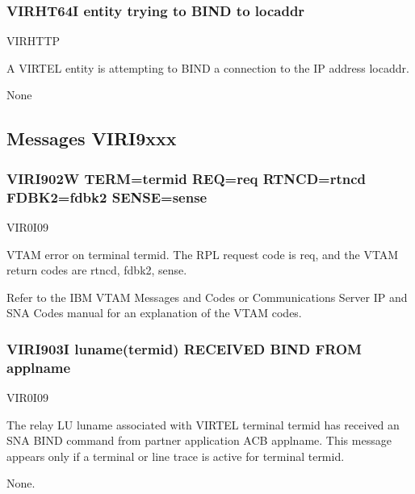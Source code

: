 \documentclass[letterpaper,10pt,english]{sphinxmanual}
\begin{document}
\subsubsection{VIRHT64I entity trying to BIND to locaddr}
\label{\detokenize{messages:virht64i-entity-trying-to-bind-to-locaddr}}\begin{description}
\sphinxAtStartPar
VIRHTTP

\sphinxAtStartPar
A VIRTEL entity is attempting to BIND a connection to the IP address locaddr.

\sphinxAtStartPar
None

\end{description}


\subsection{Messages VIRI9xxx}
\label{\detokenize{messages:messages-viri9xxx}}

\subsubsection{VIRI902W TERM=termid REQ=req RTNCD=rtncd FDBK2=fdbk2 SENSE=sense}
\label{\detokenize{messages:viri902w-term-termid-req-req-rtncd-rtncd-fdbk2-fdbk2-sense-sense}}\begin{description}
\sphinxAtStartPar
VIR0I09

\sphinxAtStartPar
VTAM error on terminal termid. The RPL request code is req, and the VTAM return codes are rtncd, fdbk2, sense.

\sphinxAtStartPar
Refer to the IBM VTAM Messages and Codes or Communications Server IP and SNA Codes manual for an explanation of the VTAM codes.

\end{description}


\subsubsection{VIRI903I luname(termid) RECEIVED BIND FROM applname}
\label{\detokenize{messages:viri903i-luname-termid-received-bind-from-applname}}\begin{description}
\sphinxAtStartPar
VIR0I09

\sphinxAtStartPar
The relay LU luname associated with VIRTEL terminal termid has received an SNA BIND command from partner application ACB applname. This message appears only if a terminal or line trace is active for terminal termid.

\sphinxAtStartPar
None.

\end{description}
\end{document}
